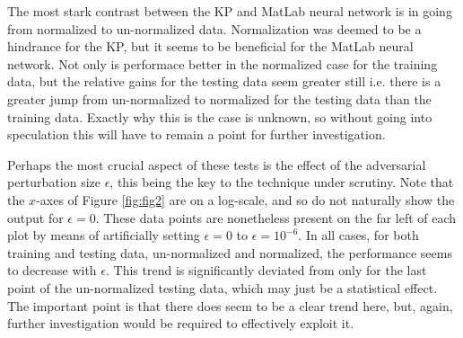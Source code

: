 \documentclass          {article} %
\begin{document}
The most stark contrast between the KP and MatLab neural network is in going from normalized to un-normalized data. Normalization was deemed to be a hindrance for the KP, but it seems to be beneficial for the MatLab neural network. Not only is performace better in the normalized case for the training data, but the relative gains for the testing data seem greater still i.e. there is a greater jump from un-normalized to normalized for the testing data than the training data. Exactly why this is the case is unknown, so without going into speculation this will have to remain a point for further investigation.

Perhaps the most crucial aspect of these tests is the effect of the adversarial perturbation size $\epsilon$, this being the key to the technique under scrutiny. Note that the $x$-axes of Figure \ref{fig:fig2} are on a log-scale, and so do not naturally show the output for $\epsilon=0$. These data points are nonetheless present on the far left of each plot by means of artificially setting $\epsilon=0$ to $\epsilon=10^{-6}$. In all cases, for both training and testing data, un-normalized and normalized, the performance seems to decrease with $\epsilon$. This trend is significantly deviated from only for the last point of the un-normalized testing data, which may just be a statistical effect. The important point is that there does seem to be a clear trend here, but, again, further investigation would be required to effectively exploit it.
\end{document}
